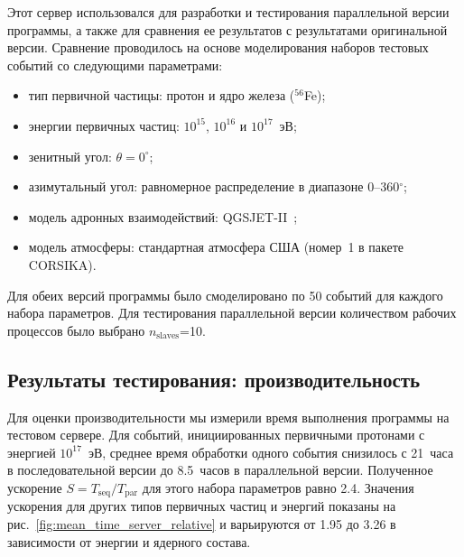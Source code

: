 \documentclass[aps,preprint,showpacs,aps,amsmath,showkeys,nobibnotes,nofootinbib,footnotes,superscriptaddress]{revtex4-2}
\begin{document}
Этот сервер использовался для разработки и тестирования параллельной версии программы, а также для сравнения ее результатов с результатами оригинальной версии. Сравнение проводилось на основе моделирования наборов тестовых событий со следующими параметрами:

\begin{itemize}
\item тип первичной частицы: протон и ядро железа ($^{56}$Fe);
\item энергии первичных частиц: $10^{15}$, $10^{16}$ и $10^{17}$~эВ;
\item зенитный угол: $\theta = 0^\circ$;
\item азимутальный угол: равномерное распределение в диапазоне 0--360$^\circ$;
\item модель адронных взаимодействий: QGSJET-II~\cite{qgsIIa, qgsIIb};
\item модель атмосферы: стандартная атмосфера США (номер~1 в пакете CORSIKA).
\end{itemize}

Для обеих версий программы было смоделировано по 50 событий для каждого набора параметров. Для тестирования параллельной версии количеством рабочих процессов было выбрано $n_{\text{slaves}}$=10.


\subsection{Результаты тестирования: производительность}
\label{subsec:experimental_results}

Для оценки производительности мы измерили время выполнения  программы на тестовом сервере.
Для событий, инициированных первичными протонами с энергией $10^{17}$~эВ, среднее время обработки одного события снизилось с 21~часа в последовательной версии до 8.5~часов в параллельной версии. Полученное ускорение $S = T_{\mathrm{seq}} / T_{\mathrm{par}}$ для этого набора параметров равно 2.4. Значения ускорения для других типов первичных частиц и энергий показаны на рис.~\ref{fig:mean_time_server_relative} и варьируются от 1.95 до 3.26 в зависимости от энергии и ядерного состава.

\end{document}
